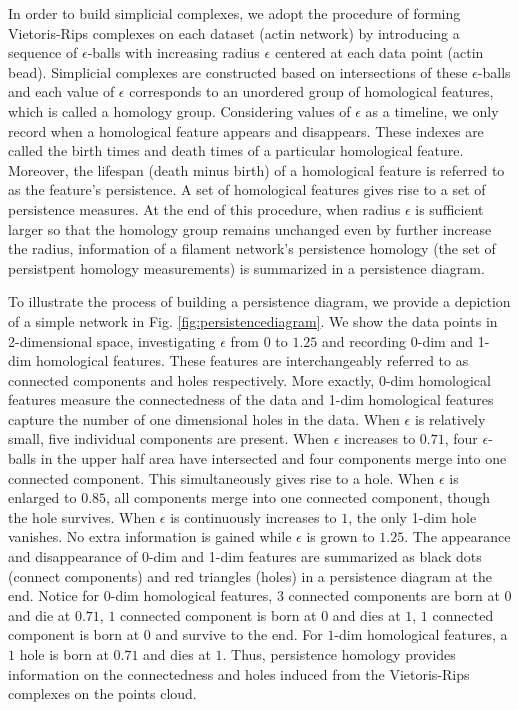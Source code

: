 \documentclass[10pt]{article}
\begin{document}
In order to build simplicial complexes, we adopt the procedure of forming Vietoris-Rips complexes on each dataset (actin network) by introducing a sequence of $\epsilon$-balls with increasing radius $\epsilon$ centered at each data point (actin bead). Simplicial complexes are constructed based on intersections of these $\epsilon$-balls and each value of $\epsilon$ corresponds to an unordered group of homological features, which is called a homology group. Considering values of $\epsilon$ as a timeline, we only record when a homological feature appears and disappears. These indexes are called the birth times and death times of a particular homological feature. Moreover, the lifespan (death minus birth) of a homological feature is referred to as the feature's persistence. A set of homological features gives rise to a set of persistence measures. At the end of this procedure, when radius $\epsilon$ is sufficient larger so that the homology group remains unchanged even by further increase the radius, information of a filament network's persistence homology (the set of persistpent homology measurements) is summarized in a persistence diagram.

To illustrate the process of building a persistence diagram, we provide a depiction of a simple network in Fig. \ref{fig:persistencediagram}. We show the data points in 2-dimensional space, investigating $\epsilon$ from $0$ to $1.25$ and recording 0-dim and 1-dim homological features. These features are interchangeably referred to as connected components and holes respectively. More exactly, 0-dim homological features measure the connectedness of the data and 1-dim homological features capture the number of one dimensional holes in the data. When $\epsilon$ is relatively small, five individual components are present. When $\epsilon$ increases to $0.71$, four $\epsilon$-balls in the upper half area have intersected and four components merge into one connected component. This simultaneously gives rise to a hole. When $\epsilon$ is enlarged to $0.85$, all components merge into one connected component, though the hole survives. When $\epsilon$ is continuously increases to $1$, the only 1-dim hole vanishes. No extra information is gained while $\epsilon$ is grown to $1.25$. The appearance and disappearance of 0-dim and 1-dim features are summarized as black dots (connect components) and red triangles (holes) in a persistence diagram at the end. Notice for $0$-dim homological features, $3$ connected components are born at $0$ and die at $0.71$, $1$ connected component is born at $0$ and dies at $1$, $1$ connected component is born at $0$ and survive to the end. For $1$-dim homological features, a $1$ hole is born at $0.71$ and dies at $1$. Thus, persistence homology provides information on the connectedness and holes induced from the Vietoris-Rips complexes on the points cloud. 
\end{document}
